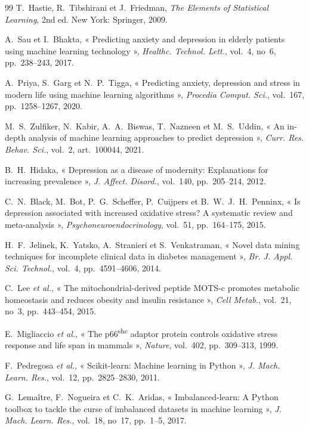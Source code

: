 \begin{thebibliography}{99}
 T.~Hastie, R.~Tibshirani et J.~Friedman, \emph{The Elements of Statistical Learning}, 2nd ed. New York: Springer, 2009.

 A.~Sau et I.~Bhakta, « Predicting anxiety and depression in elderly patients using machine learning technology », \emph{Healthc. Technol. Lett.}, vol.~4, no~6, pp.~238--243, 2017.

 A.~Priya, S.~Garg et N.~P.~Tigga, « Predicting anxiety, depression and stress in modern life using machine learning algorithms », \emph{Procedia Comput. Sci.}, vol.~167, pp.~1258--1267, 2020.

 M.~S.~Zulfiker, N.~Kabir, A.~A.~Biswas, T.~Nazneen et M.~S.~Uddin, « An in-depth analysis of machine learning approaches to predict depression », \emph{Curr. Res. Behav. Sci.}, vol.~2, art.~100044, 2021.

 B.~H.~Hidaka, « Depression as a disease of modernity: Explanations for increasing prevalence », \emph{J. Affect. Disord.}, vol.~140, pp.~205--214, 2012.

 C.~N.~Black, M.~Bot, P.~G.~Scheffer, P.~Cuijpers et B.~W.~J.~H.~Penninx, « Is depression associated with increased oxidative stress? A systematic review and meta-analysis », \emph{Psychoneuroendocrinology}, vol.~51, pp.~164--175, 2015.

 H.~F.~Jelinek, K.~Yatsko, A.~Stranieri et S.~Venkatraman, « Novel data mining techniques for incomplete clinical data in diabetes management », \emph{Br. J. Appl. Sci. Technol.}, vol.~4, pp.~4591--4606, 2014.

 C.~Lee \emph{et al.}, « The mitochondrial-derived peptide MOTS-c promotes metabolic homeostasis and reduces obesity and insulin resistance », \emph{Cell Metab.}, vol.~21, no~3, pp.~443--454, 2015.

 E.~Migliaccio \emph{et al.}, « The p66\textsuperscript{shc} adaptor protein controls oxidative stress response and life span in mammals », \emph{Nature}, vol.~402, pp.~309--313, 1999.

 F.~Pedregosa \emph{et al.}, « Scikit-learn: Machine learning in Python », \emph{J. Mach. Learn. Res.}, vol.~12, pp.~2825--2830, 2011.

 G.~Lema\^itre, F.~Nogueira et C.~K.~Aridas, « Imbalanced-learn: A Python toolbox to tackle the curse of imbalanced datasets in machine learning », \emph{J. Mach. Learn. Res.}, vol.~18, no~17, pp.~1--5, 2017.


\end{thebibliography}
